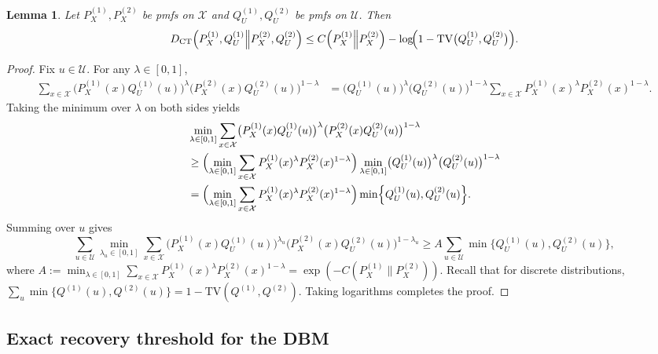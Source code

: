 \documentclass[11pt]{article}
\theoremstyle{plain}
\newtheorem{lemma}[theorem]{Lemma}
\theoremstyle{definition}
\begin{document}
\begin{lemma}\label{prop:CT_upper_bound}
Let $P_X^{(1)},P_X^{(2)}$ be pmfs on $\mathcal X$ and $Q_U^{(1)},Q_U^{(2)}$ be pmfs on $\mathcal U$.
Then
\[
D_{\mathrm{CT}}\Bigl(P_X^{(1)},Q_U^{(1)}\Big\|P_X^{(2)},Q_U^{(2)}\Bigr)
\le
C\Bigl(P_X^{(1)}\Big\|P_X^{(2)}\Bigr)
-\log\!\Bigl(1-\mathrm{TV}\bigl(Q_U^{(1)},Q_U^{(2)}\bigr)\Bigr).
\]
\end{lemma}

\begin{proof}
Fix $u\in\mathcal U$. For any $\lambda\in[0,1]$,
\begin{align*}
\sum_{x\in\mathcal X}
\bigl(P_X^{(1)}(x)Q_U^{(1)}(u)\bigr)^{\lambda}
\bigl(P_X^{(2)}(x)Q_U^{(2)}(u)\bigr)^{1-\lambda}
&=
\bigl(Q_U^{(1)}(u)\bigr)^{\lambda}\bigl(Q_U^{(2)}(u)\bigr)^{1-\lambda}
\sum_{x\in\mathcal X} P_X^{(1)}(x)^\lambda P_X^{(2)}(x)^{1-\lambda}.
\end{align*}
Taking the minimum over $\lambda$ on both sides yields
\begin{align*}
&\min_{\lambda\in[0,1]}\sum_{x\in\mathcal X}
\bigl(P_X^{(1)}(x)Q_U^{(1)}(u)\bigr)^{\lambda}
\bigl(P_X^{(2)}(x)Q_U^{(2)}(u)\bigr)^{1-\lambda}
\\
&\ge
\Bigl(\min_{\lambda\in[0,1]}\sum_{x\in\mathcal X} P_X^{(1)}(x)^\lambda P_X^{(2)}(x)^{1-\lambda}\Bigr)
\min_{\lambda\in[0,1]}\bigl(Q_U^{(1)}(u)\bigr)^{\lambda}\bigl(Q_U^{(2)}(u)\bigr)^{1-\lambda}\\
&=
\Bigl(\min_{\lambda\in[0,1]}\sum_{x\in\mathcal X} P_X^{(1)}(x)^\lambda P_X^{(2)}(x)^{1-\lambda}\Bigr)
\min \Bigl\{Q_U^{(1)}(u),Q_U^{(2)}(u) \Bigr\}.
\end{align*}
Summing over $u$ gives
\[
\sum_{u\in\mathcal U}\min_{\lambda_u\in[0,1]}\sum_{x\in\mathcal X}
\bigl(P_X^{(1)}(x)Q_U^{(1)}(u)\bigr)^{\lambda_u}
\bigl(P_X^{(2)}(x)Q_U^{(2)}(u)\bigr)^{1-\lambda_u}
\ge
A\sum_{u\in\mathcal{U}} \min\{Q_U^{(1)}(u),Q_U^{(2)}(u)\},
\]
where $A:=\min_{\lambda\in[0,1]}\sum_{x\in\mathcal X} P_X^{(1)}(x)^\lambda P_X^{(2)}(x)^{1-\lambda}=\exp(-C(P_X^{(1)}\|P_X^{(2)}))$. Recall that for discrete distributions,
$\sum_{u}\min\{Q^{(1)}(u),Q^{(2)}(u)\}=1-\mathrm{TV}(Q^{(1)},Q^{(2)}).$
Taking logarithms completes the proof.
\end{proof}
\subsection{Exact recovery threshold for the DBM}\label{subsec:DBM_threshold}
\end{document}
